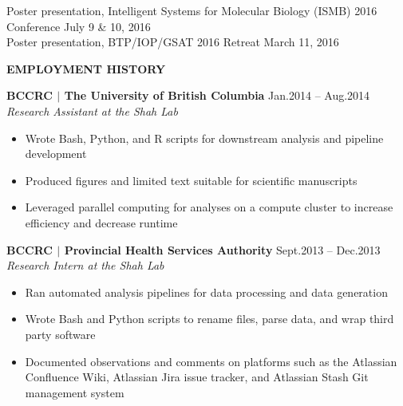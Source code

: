 \documentclass{res}
\renewcommand{\section}[1]{%
  \vspace{0.3in}%
  \centerline{\uppercase{\bf{#1}}}%
  \vspace{-6pt}}
\newcommand{\linepresentation}[3]{%
  #3 \hfill #1\\[.75ex]}
\newcommand{\linehead}[2]{%
  {\bf #1} \hfill #2\\}
\newcommand{\linetitle}[1]{%
  {\sl #1}}
\begin{document}
\begin{resume}
\linepresentation{July 9 \& 10, 2016}{%
  Bioinformatic characterization of the normal thyroid reference epigenome}{%
  Poster presentation, Intelligent Systems for Molecular Biology (ISMB) 2016 Conference}
\linepresentation{March 11, 2016}{%
  Characterization of the normal reference thyroid epigenome}{%
  Poster presentation, BTP/IOP/GSAT 2016 Retreat}
\vspace{-1.5em}

\section{Employment history}

\linehead{BCCRC $|$ The University of British Columbia}{Jan.2014 -- Aug.2014}
\linetitle{Research Assistant at the Shah Lab}
\begin{itemize}
  \item Wrote Bash, Python, and R scripts for downstream analysis and pipeline development
  \item Produced figures and limited text suitable for scientific manuscripts
  \item Leveraged parallel computing for analyses on a compute cluster to increase efficiency and decrease runtime
\end{itemize}

\linehead{BCCRC $|$ Provincial Health Services Authority}{Sept.2013 -- Dec.2013}
\linetitle{Research Intern at the Shah Lab}
\begin{itemize}
  \item Ran automated analysis pipelines for data processing and data generation
  \item Wrote Bash and Python scripts to rename files, parse data, and wrap third party software
  \item Documented observations and comments on platforms such as the Atlassian Confluence Wiki, Atlassian Jira issue tracker, and Atlassian Stash Git management system
\end{itemize}


\end{resume}
\end{document}
